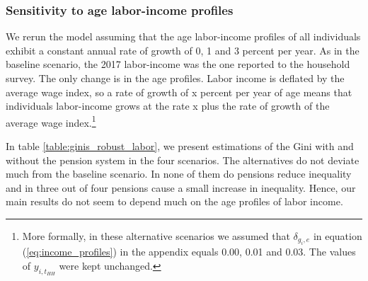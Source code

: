 \documentclass{article}
\begin{document}
\subsubsection{Sensitivity to age labor-income profiles} \label{subsubsec:profiles}
We rerun the model assuming that the age labor-income profiles of all individuals exhibit a constant annual rate of growth of 0, 1 and 3 percent per year. As in the baseline scenario, the 2017 labor-income was the one reported to the household survey. The only change is in the age profiles. Labor income is deflated by the average wage index, so a rate of growth of x percent per year of age means that individuals labor-income grows at the rate x plus the rate of growth of the average wage index.\footnote{More formally, in these alternative scenarios we assumed that $\delta_{g_i,e}$ in equation (\ref{eq:income_profiles}) in the appendix equals 0.00, 0.01 and 0.03. The values of $y_{i,t_{HH}}$ were kept unchanged.}   

In table \ref{table:ginis_robust_labor}, we present estimations of the Gini with and without the pension system in the four scenarios. The alternatives do not deviate much from the baseline scenario. In none of them do pensions reduce inequality and in three out of four pensions cause a small increase in inequality. Hence, our main results do not seem to depend much on the age profiles of labor income.  
\end{document}
